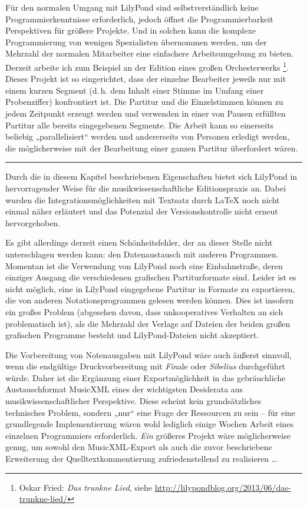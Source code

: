 \documentclass[DIV=12]{scrreprt}
\begin{document}
Für den normalen Umgang mit LilyPond sind selbstverständlich keine Programmierkenntnisse erforderlich, jedoch öffnet die Programmierbarkeit Perspektiven für größere Projekte.
Und in solchen kann die komplexe Programmierung von wenigen Spezialisten übernommen werden, um der Mehrzahl der normalen Mitarbeiter eine einfachere Arbeitsumgebung zu bieten.
Derzeit arbeite ich zum Beispiel an der Edition eines großen Orchesterwerks%
\footnote{Oskar Fried: \emph{Das trunkne Lied}, siehe \url{http://lilypondblog.org/2013/06/das-trunkne-lied/}}.
Dieses Projekt ist so eingerichtet, dass der einzelne Bearbeiter jeweils nur mit einem kurzen Segment (d.\,h. dem Inhalt einer Stimme im Umfang einer Probenziffer) konfrontiert ist.
Die Partitur und die Einzelstimmen können zu jedem Zeitpunkt erzeugt werden und verwenden in einer von Pausen erfüllten Partitur alle bereits eingegebenen Segmente.
Die Arbeit kann so einerseits beliebig „parallelisiert“ werden und andererseits von Personen erledigt werden, die möglicherweise mit der Bearbeitung einer ganzen Partitur überfordert wären.

\bigskip
\hrule
\bigskip

Durch die in diesem Kapitel beschriebenen Eigenschaften bietet sich LilyPond in hervorragender Weise für die musikwissenschaftliche Editionspraxis an.
Dabei wurden die Integrationsmöglichkeiten mit Textsatz durch \LaTeX{} noch nicht einmal näher erläutert und das Potenzial der Versionskontrolle nicht erneut hervorgehoben.

Es gibt allerdings derzeit einen Schönheitsfehler, der an dieser Stelle nicht unterschlagen werden kann: den Datenaustausch mit anderen Programmen.
Momentan ist die Verwendung von LilyPond noch eine Einbahnstraße, deren einziger Ausgang die verschiedenen grafischen Partiturformate sind.
Leider ist es nicht möglich, eine in LilyPond eingegebene Partitur in Formate zu exportieren, die von anderen Notationsprogrammen gelesen werden können.
Dies ist insofern ein großes Problem (abgesehen davon, dass unkooperatives Verhalten an sich problematisch ist), als die Mehrzahl der Verlage auf Dateien der beiden großen grafischen Programme besteht und LilyPond-Dateien nicht akzeptiert.

Die Vorbereitung von Notenausgaben mit LilyPond wäre auch äußerst sinnvoll, wenn die endgültige Druckvorbereitung mit \emph{Fin}ale oder \emph{Sibelius} durchgeführt würde.
Daher ist die Ergänzung einer Exportmöglichkeit in das gebräuchliche Austauschformat MusicXML eines der wichtigsten Desiderata aus musikwissenschaftlicher Perspektive.
Diese scheint kein grundsätzliches technisches Problem, sondern „nur“ eine Frage der Ressourcen zu sein -- für eine grundlegende Implementierung wären wohl lediglich einige Wochen Arbeit eines einzelnen Programmiers erforderlich.
\emph{Ein} größeres Projekt wäre möglicherweise genug, um sowohl den MusicXML-Export als auch die zuvor beschriebene Erweiterung der Quelltextkommentierung zufriedenstellend zu realisieren \dots
\end{document}
